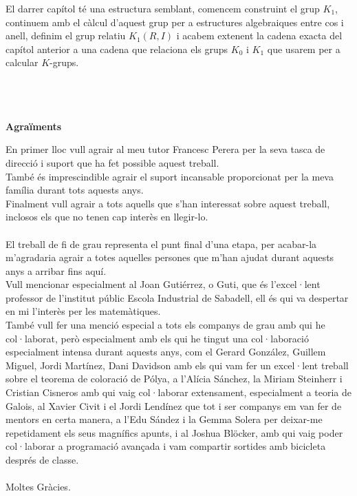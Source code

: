 \documentclass[
11pt, %
catalan, %
singlespacing, %
headsepline, %
consistentlayout, %
]{MastersDoctoralThesis} %
\theoremstyle{definition}
\begin{document}
\begin{acknowledgements}
\indent El darrer capítol té una estructura semblant, comencem construint el grup $K_1$, continuem amb el càlcul d'aquest grup per a estructures algebraiques entre cos i anell, definim el grup relatiu $K_1(R,I)$ i acabem extenent la cadena exacta del capítol anterior a una cadena que relaciona els grups $K_0$ i $K_1$ que usarem per a calcular $K$-grups.
\\\\\\\\


 \begin{center}
 \Large \textbf{Agraïments}
 \end{center}
\addchaptertocentry{\acknowledgementname} %
En primer lloc vull agrair al meu tutor Francesc Perera per la seva tasca de direcció i suport que ha fet possible aquest treball. \\
\indent També és imprescindible agrair el suport incansable proporcionat per la meva família durant tots aquests anys. \\ 
\indent Finalment vull agrair a tots aquells que s'han interessat sobre aquest treball, inclosos els que no tenen cap interès en llegir-lo.
\\\\
El treball de fi de grau representa el punt final d'una etapa, per acabar-la m'agradaria agrair a totes aquelles persones que m'han ajudat durant aquests anys a arribar fins aquí.\\
\indent Vull mencionar especialment al Joan Gutiérrez, o Guti, que és l'excel·lent professor de l'institut públic Escola Industrial de Sabadell,  ell és qui va despertar en mi l'interès per les matemàtiques. \\
\indent També vull fer una menció especial a tots els companys de grau amb qui he col·laborat, però especialment amb els qui he tingut una col·laboració especialment intensa durant aquests anys, com el Gerard González, Guillem Miguel, Jordi Martínez, Dani Davidson amb els qui vam fer un excel·lent treball sobre el teorema de coloració de Pólya, a l'Alícia Sánchez, la Miriam Steinherr i Cristian Cisneros amb qui vaig col·laborar extensament, especialment a teoria de Galois, al Xavier Civit i el Jordi Lendínez que tot i ser companys em van fer de mentors en certa manera,  a l'Edu Sández i la Gemma Solera per deixar-me repetidament els seus magnífics apunts, i al Joshua Blöcker, amb qui vaig poder col·laborar a programació avançada i vam compartir sortides amb bicicleta després de classe. \\ \\
Moltes Gràcies.


\end{acknowledgements}
\end{document}
